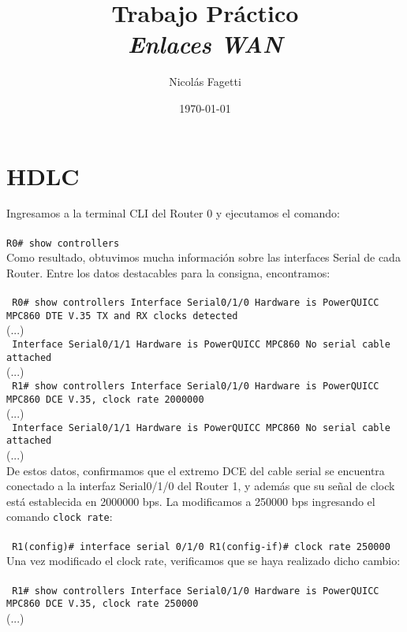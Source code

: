 \documentclass{article}
\title{ Trabajo Práctico \\ 
    \vspace{15}
    \textit{Enlaces WAN} \\
}
\author{Nicolás Fagetti}
\date{\today}
\begin{document}
\maketitle

\section{HDLC}

Ingresamos a la terminal CLI del Router 0 y ejecutamos el comando: \\\\
\texttt{R0\# show controllers} \\

Como resultado, obtuvimos mucha información sobre las interfaces Serial de cada Router. Entre los datos destacables para la consigna, encontramos: \\\\
\texttt{
R0\# show controllers
Interface Serial0/1/0
Hardware is PowerQUICC MPC860
DTE V.35 TX and RX clocks detected
} \\
(...) \\
\texttt{
Interface Serial0/1/1
Hardware is PowerQUICC MPC860
No serial cable attached
} \\
(...) \\
\texttt{
R1\# show controllers
Interface Serial0/1/0
Hardware is PowerQUICC MPC860
DCE V.35, clock rate 2000000
} \\
(...) \\
\texttt{
Interface Serial0/1/1
Hardware is PowerQUICC MPC860
No serial cable attached
} \\
(...) \\

De estos datos, confirmamos que el extremo DCE del cable serial se encuentra conectado a la interfaz Serial0/1/0 del Router 1, y además que su señal de clock está establecida en 2000000 bps. La modificamos a 250000 bps ingresando el comando \texttt{clock rate}: \\\\
\texttt{
R1(config)\# interface serial 0/1/0
R1(config-if)\# clock rate 250000
} \\

Una vez modificado el clock rate, verificamos que se haya realizado dicho cambio: \\\\
\texttt{
R1\# show controllers
Interface Serial0/1/0
Hardware is PowerQUICC MPC860
DCE V.35, clock rate 250000
} \\
(...) \\
\end{document}
